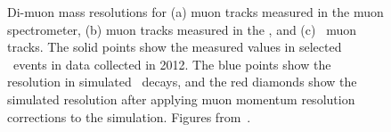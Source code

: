 \begin{figure}[h]
\centering
    \caption[Di-muon mass resolutions for muon tracks in different detector
    subsystems.]{Di-muon mass resolutions for (a) muon tracks measured in the muon
    spectrometer, (b) muon tracks measured in the \id, and (c) \combined\
    muon tracks. The solid points show the measured values in selected \Zmm\ events
    in data collected in 2012. The blue points show the resolution in simulated
    \Zmm\ decays, and the red diamonds show the simulated resolution after applying
    muon momentum resolution corrections to the simulation. Figures
    from~\cite{MuonPerfPlots2012}.}
\label{fig:mu-resolution-dimu}
\end{figure}

